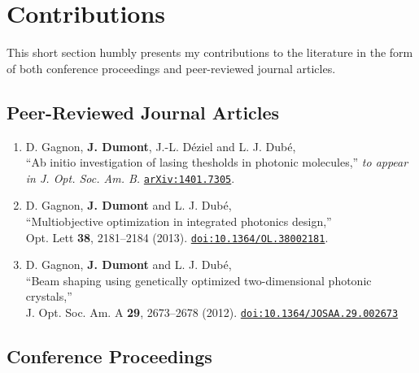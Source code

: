 \chapter*{Contributions}
This short section humbly presents my contributions to the 
literature in the form of both conference proceedings and 
peer-reviewed journal articles. 

\section*{Peer-Reviewed Journal Articles}
\renewcommand*{\thefootnote}{\fnsymbol{footnote}}

\begin{enumerate}
  \item[\cite{GAG2014a}] D. Gagnon, \textbf{J. Dumont}, J.-L. Déziel and L. J. Dubé, \\
	``Ab initio investigation of lasing thesholds in photonic molecules,'' \textit{to appear in J. Opt. Soc. Am. B.}
	\href{http://arxiv.og/abs/1401.7305}{\texttt{arXiv:1401.7305}}.
  \item[\cite{GAG2013c}]D. Gagnon, \textbf{J. Dumont} and L. J. Dubé, \\
	``Multiobjective optimization in integrated photonics design,''\\
	Opt. Lett \textbf{38}, 2181--2184 (2013). 
	\href{http://dx.doi.org/10.1364/OL.38002181}{\texttt{doi:10.1364/OL.38002181}}.
  \item[\cite{GAG2012}]D. Gagnon, \textbf{J. Dumont} and L. J. Dubé, \\
	``Beam shaping using genetically optimized two-dimensional photonic crystals,''\\
	J. Opt. Soc. Am. A \textbf{29}, 2673--2678 (2012). 
	\href{http://dx.doi.org/10.1364/JOSAA.29.002673}{\texttt{doi:10.1364/JOSAA.29.002673}}
\end{enumerate}

\clearpage
\section*{Conference Proceedings}
\renewcommand*{\thefootnote}{\roman{footnote}}
\setcounter{footnote}{0}

